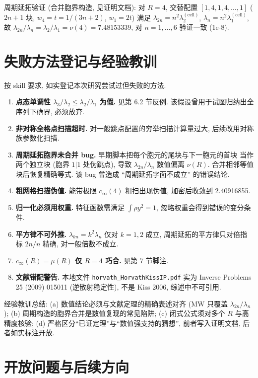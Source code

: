 \documentclass[UTF8]{ctexart}
\begin{document}
周期延拓验证 (合并胞界构造, 见证明文档): 对 $R=4$, 交替配置 $[1,4,1,4,\dots,1]$
($2n+1$ 块, $w_4 = t = 1/(3n+2)$, $w_1 = 2t$) 满足
$\lambda_{2n} = n^2 \lambda_2^{(\text{cell})}$, $\lambda_n = n^2 \lambda_1^{(\text{cell})}$,
故 $\lambda_{2n}/\lambda_n = \lambda_2/\lambda_1 = \nu(4) = 7.48153339$,
对 $n = 1, \dots, 6$ 验证一致 (1e-8).

\section{失败方法登记与经验教训}

按 skill 要求, 如实登记本次研究尝试过但失败的方法.

\begin{enumerate}
	\item \textbf{点态单调性 $\lambda_3/\lambda_2 \leq \lambda_2/\lambda_1$ 为假.}
		见第 6.2 节反例. 该假设曾用于试图归纳出全序列下确界, 必须放弃.
	\item \textbf{非对称全格点扫描超时.} 对一般跳点配置的穷举扫描计算量过大,
		后续改用对称族参数化扫描.
	\item \textbf{周期延拓胞界未合并 bug.} 早期脚本把每个胞元的尾块与下一胞元的首块
		当作两个独立块 (胞界 $1|1$ 处伪跳点), 导致 $\lambda_{2n}/\lambda_n$ 数值偏离 $\nu(R)$.
		合并相邻等值块后恢复精确等式. 该 bug 曾造成 ``周期延拓字面不成立'' 的错误结论.
	\item \textbf{粗网格扫描伪值.} 能带极限 $c_{\infty}(4)$ 粗扫出现伪值,
		加密后收敛到 2.40916855.
	\item \textbf{归一化必须用权重.} 特征函数需满足 $\int \rho y^2 = 1$,
		忽略权重会得到错误的变分条件.
	\item \textbf{平方律不可外推.} $\lambda_{kn} = k^2\lambda_n$ 仅对 $k = 1, 2$ 成立,
		周期延拓的平方律只对倍指标 $2n/n$ 精确, 对一般倍数不成立.
	\item \textbf{$c_{\infty}(R) = \mu(R)$ 仅 $R = 4$ 巧合.} 见第 7 节脚注.
	\item \textbf{文献错配警告.} 本地文件 \texttt{horvath\_HorvathKissIP.pdf} 实为
		Inverse Problems 25 (2009) 015011 (逆散射稳定性), 不是 Kiss 2006, 综述中不可引用.
\end{enumerate}

经验教训总结: (a) 数值结论必须与文献定理的精确表述对齐 (MW 只覆盖 $\lambda_{2n}/\lambda_n$);
(b) 周期构造的胞界合并是数值复现的常见陷阱; (c) 闭式公式须对多个 $R$ 与高精度核验;
(d) 严格区分``已证定理''与``数值强支持的猜想'', 前者写入证明文档, 后者如实标注开放.

\section{开放问题与后续方向}
\end{document}

